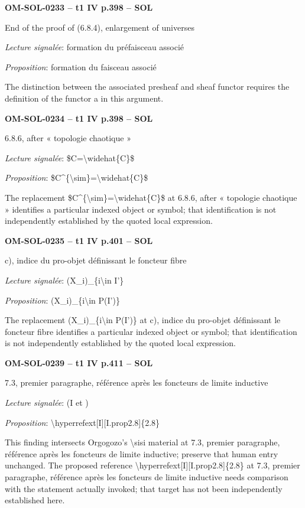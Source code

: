 \par\noindent\textbf{OM-SOL-0233 -- t1 IV p.398 -- SOL}\par
End of the proof of (6.8.4), enlargement of universes\par
\emph{Lecture signalée}: formation du préfaisceau associé\par
\emph{Proposition}: formation du faisceau associé\par
The distinction between the associated presheaf and sheaf functor requires the definition of the functor a in this argument.\par
\par\noindent\textbf{OM-SOL-0234 -- t1 IV p.398 -- SOL}\par
6.8.6, after « topologie chaotique »\par
\emph{Lecture signalée}: \$C=\allowbreak \textbackslash{}widehat\{C\}\$\par
\emph{Proposition}: \$C\textasciicircum{}\{\textbackslash{}sim\}=\allowbreak \textbackslash{}widehat\{C\}\$\par
The replacement \$C\textasciicircum{}\{\textbackslash{}sim\}=\allowbreak \textbackslash{}widehat\{C\}\$ at 6.8.6, after « topologie chaotique » identifies a particular indexed object or symbol; that identification is not independently established by the quoted local expression.\par
\par\noindent\textbf{OM-SOL-0235 -- t1 IV p.401 -- SOL}\par
c), indice du pro-objet définissant le foncteur fibre\par
\emph{Lecture signalée}: (X\_i)\_\{i\textbackslash{}in I'\}\par
\emph{Proposition}: (X\_i)\_\{i\textbackslash{}in P(I')\}\par
The replacement (X\_i)\_\{i\textbackslash{}in P(I')\} at c), indice du pro-objet définissant le foncteur fibre identifies a particular indexed object or symbol; that identification is not independently established by the quoted local expression.\par
\par\noindent\textbf{OM-SOL-0239 -- t1 IV p.411 -- SOL}\par
7.3, premier paragraphe, référence après les foncteurs de limite inductive\par
\emph{Lecture signalée}: (I et )\par
\emph{Proposition}: \textbackslash{}hyperrefext[I][I.prop2.8]\{2.8\}\par
This finding intersects Orgogozo's \textbackslash{}sisi material at 7.3, premier paragraphe, référence après les foncteurs de limite inductive; preserve that human entry unchanged. The proposed reference \textbackslash{}hyperrefext[I][I.prop2.8]\{2.8\} at 7.3, premier paragraphe, référence après les foncteurs de limite inductive needs comparison with the statement actually invoked; that target has not been independently established here.\par
